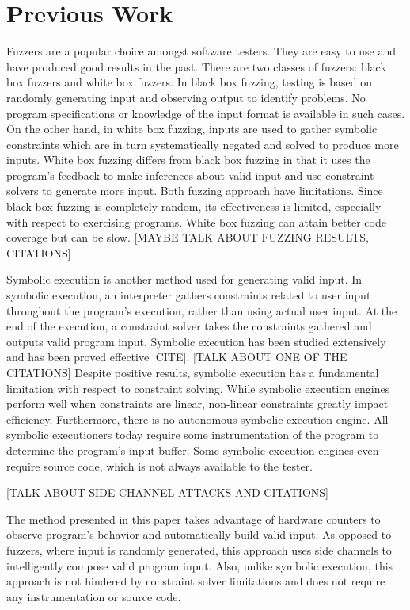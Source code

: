 \documentclass[10pt,twocolumn]{article}
\begin{document}
\section{Previous Work}

Fuzzers are a popular choice amongst software testers.
They are easy to use and have produced good results in the past.
There are two classes of fuzzers: black box fuzzers and white box fuzzers.
In black box fuzzing, testing is based on randomly generating input and observing output to identify problems.
No program specifications or knowledge of the input format is available in such cases.
On the other hand, in white box fuzzing, inputs are used to gather symbolic constraints which are in turn systematically negated and solved to produce more inputs.
White box fuzzing differs from black box fuzzing in that it uses the program's feedback to make inferences about valid input and use constraint solvers to generate more input.
Both fuzzing approach have limitations.
Since black box fuzzing is completely random, its effectiveness is limited, especially with respect to exercising programs.
White box fuzzing can attain better code coverage but can be slow.
[MAYBE TALK ABOUT FUZZING RESULTS, CITATIONS]

Symbolic execution is another method used for generating valid input.
In symbolic execution, an interpreter gathers constraints related to user input throughout the program's execution, rather than using actual user input.
At the end of the execution, a constraint solver takes the constraints gathered and outputs valid program input.
Symbolic execution has been studied extensively and has been proved effective [CITE].
[TALK ABOUT ONE OF THE CITATIONS]
Despite positive results, symbolic execution has a fundamental limitation with respect to constraint solving.
While symbolic execution engines perform well when constraints are linear, non-linear constraints greatly impact efficiency.
Furthermore, there is no autonomous symbolic execution engine.
All symbolic executioners today require some instrumentation of the program to determine the program's input buffer.
Some symbolic execution engines even require source code, which is not always available to the tester.

[TALK ABOUT SIDE CHANNEL ATTACKS AND CITATIONS]

The method presented in this paper takes advantage of hardware counters to observe program's behavior and automatically build valid input.
As opposed to fuzzers, where input is randomly generated, this approach uses side channels to intelligently compose valid program input.
Also, unlike symbolic execution, this approach is not hindered by constraint solver limitations and does not require any instrumentation or source code.
\end{document}
